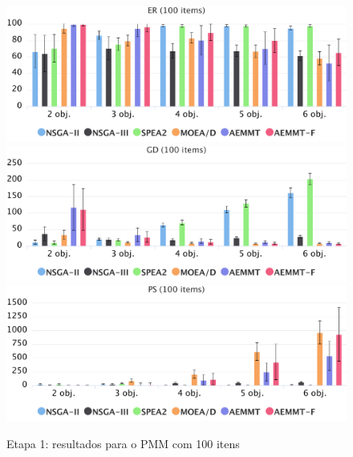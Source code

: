\begin{figure}[!htbp]
	\caption{Etapa 1: resultados para o PMM com 100 itens}
	\label{fig_exp1_pmm_100}
	\includegraphics[width=1\textwidth]{cap_experimentos/figs/etapa1/er-mkp-100}
	\includegraphics[width=1\textwidth]{cap_experimentos/figs/etapa1/gd-mkp-100}
	\includegraphics[width=1\textwidth]{cap_experimentos/figs/etapa1/ps-mkp-100}
\end{figure}

